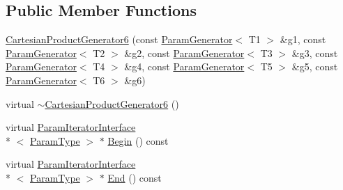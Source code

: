 \subsection*{Public Member Functions}
\begin{DoxyCompactItemize}
\item 
\hyperlink{classtesting_1_1internal_1_1_cartesian_product_generator6_a6ff15d46e4ff7f8f24215b8244a6a094}{Cartesian\-Product\-Generator6} (const \hyperlink{classtesting_1_1internal_1_1_param_generator}{Param\-Generator}$<$ T1 $>$ \&g1, const \hyperlink{classtesting_1_1internal_1_1_param_generator}{Param\-Generator}$<$ T2 $>$ \&g2, const \hyperlink{classtesting_1_1internal_1_1_param_generator}{Param\-Generator}$<$ T3 $>$ \&g3, const \hyperlink{classtesting_1_1internal_1_1_param_generator}{Param\-Generator}$<$ T4 $>$ \&g4, const \hyperlink{classtesting_1_1internal_1_1_param_generator}{Param\-Generator}$<$ T5 $>$ \&g5, const \hyperlink{classtesting_1_1internal_1_1_param_generator}{Param\-Generator}$<$ T6 $>$ \&g6)
\item 
virtual \hyperlink{classtesting_1_1internal_1_1_cartesian_product_generator6_a1a66fab3ddc3c2c00e2c2f53fc5ee96d}{$\sim$\-Cartesian\-Product\-Generator6} ()
\item 
virtual \hyperlink{classtesting_1_1internal_1_1_param_iterator_interface}{Param\-Iterator\-Interface}\\*
$<$ \hyperlink{classtesting_1_1internal_1_1_cartesian_product_generator6_a308164858b18868e45abab2f168b92db}{Param\-Type} $>$ $\ast$ \hyperlink{classtesting_1_1internal_1_1_cartesian_product_generator6_a95db6741abce1e68cfba9ed2789938fe}{Begin} () const 
\item 
virtual \hyperlink{classtesting_1_1internal_1_1_param_iterator_interface}{Param\-Iterator\-Interface}\\*
$<$ \hyperlink{classtesting_1_1internal_1_1_cartesian_product_generator6_a308164858b18868e45abab2f168b92db}{Param\-Type} $>$ $\ast$ \hyperlink{classtesting_1_1internal_1_1_cartesian_product_generator6_acea48e3f002281d8f8abcd5e586dce92}{End} () const 
\end{DoxyCompactItemize}


